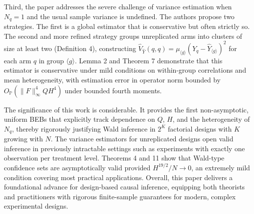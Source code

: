 \documentclass[11pt]{article}
\begin{document}
Third, the paper addresses the severe challenge of variance estimation when $N_q=1$ and the usual sample variance is undefined. The authors propose two strategies. The first is a global estimator that is conservative but often strictly so. The second and more refined strategy groups unreplicated arms into clusters of size at least two (Definition 4), constructing $\widehat{V}_{\widehat{Y}}(q,q)=\mu_{\langle g\rangle}(Y_q-\widehat{Y}_{\langle g\rangle})^2$ for each arm $q$ in group $\langle g\rangle$. Lemma 2 and Theorem 7 demonstrate that this estimator is conservative under mild conditions on within-group correlations and mean heterogeneity, with estimation error in operator norm bounded by $O_{\mathbb{P}}(\|F\|_\infty^4 Q H^4)$ under bounded fourth moments.

The significance of this work is considerable. It provides the first non-asymptotic, uniform BEBs that explicitly track dependence on $Q$, $H$, and the heterogeneity of $N_q$, thereby rigorously justifying Wald inference in $2^K$ factorial designs with $K$ growing with $N$. The variance estimators for unreplicated designs open valid inference in previously intractable settings such as experiments with exactly one observation per treatment level. Theorems 4 and 11 show that Wald-type confidence sets are asymptotically valid provided $H^{19/2}/N\to 0$, an extremely mild condition covering most practical applications. Overall, this paper delivers a foundational advance for design-based causal inference, equipping both theorists and practitioners with rigorous finite-sample guarantees for modern, complex experimental designs.
\end{document}
